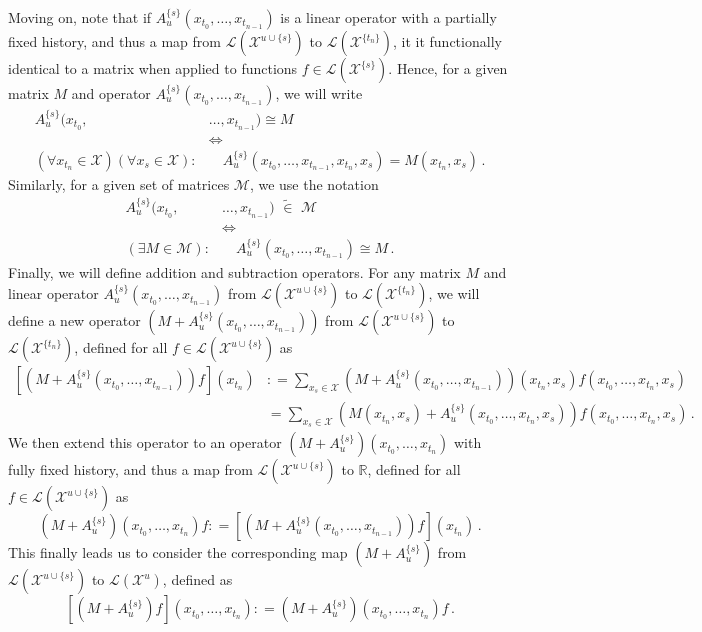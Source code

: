 \documentclass[10pt]{paper}
\newcommand{\states}{\mathcal{X}}
\newcommand{\gambles}{\mathcal{L}}
\newcommand{\coloneqq}{:\!=}
\newcommand{\opinset}{\,\,\widetilde{\in}\,\,}
\begin{document}
Moving on, note that if $A_u^{\{s\}}(x_{t_0},\ldots,x_{t_{n-1}})$ is a linear operator with a partially fixed history, and thus a map from $\gambles(\states^{u\cup\{s\}})$ to $\gambles(\states^{\{t_n\}})$, it it functionally identical to a matrix when applied to functions $f\in\gambles(\states^{\{s\}})$. Hence, for a given matrix $M$ and operator $A_u^{\{s\}}(x_{t_0},\ldots,x_{t_{n-1}})$, we will write
\begin{align*}
A_u^{\{s\}}(x_{t_0},&\ldots,x_{t_{n-1}}) \cong M \\
&\Leftrightarrow \\
(\forall x_{t_n}\in\states)(\forall x_s\in\states): &\quad A_u^{\{s\}}(x_{t_0},\ldots,x_{t_{n-1}},x_{t_n},x_s) = M(x_{t_n},x_s)\,.
\end{align*}
Similarly, for a given set of matrices $\mathcal{M}$, we use the notation
\begin{align*}
A_u^{\{s\}}(x_{t_0},&\ldots,x_{t_{n-1}})\opinset\mathcal{M} \\
&\Leftrightarrow \\
(\exists M\in\mathcal{M}): &\quad A_u^{\{s\}}(x_{t_0},\ldots,x_{t_{n-1}}) \cong M\,.
\end{align*}
Finally, we will define addition and subtraction operators. For any matrix $M$ and linear operator $A_u^{\{s\}}(x_{t_0},\ldots,x_{t_{n-1}})$ from $\gambles(\states^{u\cup\{s\}})$ to $\gambles(\states^{\{t_n\}})$, we will define a new operator $\left(M + A_u^{\{s\}}(x_{t_0},\ldots,x_{t_{n-1}})\right)$ from $\gambles(\states^{u\cup\{s\}})$ to $\gambles(\states^{\{t_n\}})$, defined for all $f\in\gambles(\states^{u\cup\{s\}})$ as
\begin{align*}
\left[\left(M + A_u^{\{s\}}(x_{t_0},\ldots,x_{t_{n-1}})\right)f\right](x_{t_n}) &\coloneqq \sum_{x_s\in\states} \left(M + A_u^{\{s\}}(x_{t_0},\ldots,x_{t_{n-1}})\right)(x_{t_n},x_s) f(x_{t_0},\ldots,x_{t_n},x_s) \\
 &= \sum_{x_s\in\states} \left(M(x_{t_n},x_s) + A_u^{\{s\}}(x_{t_0},\ldots,x_{t_n},x_s)\right)f(x_{t_0},\ldots,x_{t_n},x_s)\,.
\end{align*}
We then extend this operator to an operator $\left(M + A_u^{\{s\}}\right)(x_{t_0},\ldots,x_{t_n})$ with fully fixed history, and thus a map from $\gambles(\states^{u\cup\{s\}})$ to $\mathbb{R}$, defined for all $f\in\gambles(\states^{u\cup\{s\}})$ as
\begin{equation*}
\left(M + A_u^{\{s\}}\right)(x_{t_0},\ldots,x_{t_n})f \coloneqq \left[\left(M + A_u^{\{s\}}(x_{t_0},\ldots,x_{t_{n-1}})\right)f\right](x_{t_n})\,.
\end{equation*}
This finally leads us to consider the corresponding map $\left(M + A_u^{\{s\}}\right)$ from $\gambles(\states^{u\cup\{s\}})$ to $\gambles(\states^u)$, defined as
\begin{equation*}
\left[\left(M + A_u^{\{s\}}\right)f\right](x_{t_0},\ldots,x_{t_n}) \coloneqq \left(M + A_u^{\{s\}}\right)(x_{t_0},\ldots,x_{t_n})f\,.
\end{equation*}
\end{document}
